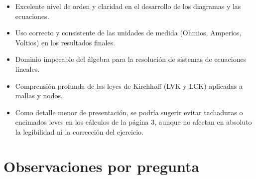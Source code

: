 \documentclass[11pt,a4paper]{article}
\begin{document}
\vspace{4pt}
\begin{minipage}[t]{0.48\linewidth}
  \begin{tcolorbox}[cajaFortaleza, title={Fortalezas}]
\begin{itemize}[leftmargin=1.5em, itemsep=2pt]
  \item Excelente nivel de orden y claridad en el desarrollo de los diagramas y las ecuaciones.
  \item Uso correcto y consistente de las unidades de medida (Ohmios, Amperios, Voltios) en los resultados finales.
  \item Dominio impecable del álgebra para la resolución de sistemas de ecuaciones lineales.
  \item Comprensión profunda de las leyes de Kirchhoff (LVK y LCK) aplicadas a mallas y nodos.
\end{itemize}
  \end{tcolorbox}
\end{minipage}
\hfill
\begin{minipage}[t]{0.48\linewidth}
  \begin{tcolorbox}[cajaMejora, title={Areas de mejora}]
\begin{itemize}[leftmargin=1.5em, itemsep=2pt]
  \item Como detalle menor de presentación, se podría sugerir evitar tachaduras o encimados leves en los cálculos de la página 3, aunque no afectan en absoluto la legibilidad ni la corrección del ejercicio.
\end{itemize}
  \end{tcolorbox}
\end{minipage}

\section*{Observaciones por pregunta}
\end{document}
